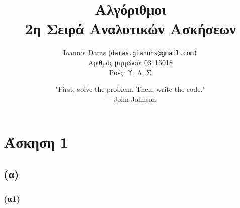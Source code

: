 \documentclass[a4paper,oneside, 11pt]{article}
\title{\textbf{Αλγόριθμοι \\ 2η Σειρά Αναλυτικών Ασκήσεων}}
\author{ Ioannis Daras (\texttt{daras.giannhs@gmail.com)} \\
		Αριθμός μητρώου: 03115018 \\
		Ροές: Υ, Λ, Σ}
\date{"First, solve the problem. Then, write the code." \\ --- John Johnson}
\begin{document}
\maketitle
\noindent\makebox[\linewidth]{\rule{0.8\paperwidth}{0.4pt}}

\section*{Άσκηση 1}
\subsection*{(α)}

\subsubsection*{(α1)}
\end{document}
